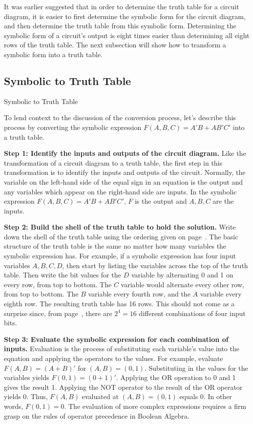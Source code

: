 It was earlier suggested that in order to determine the truth table for a
circuit diagram, it is easier to first determine the symbolic form for
the circuit diagram, and then determine the truth table from this symbolic 
form.  Determining the symbolic form of a circuit's output is eight times
easier than determining all eight rows of the truth table.
The next subsection will show how to transform a symbolic 
form into a truth table.

\subsection{Symbolic to Truth Table}

\begin{process}{Symbolic to Truth Table}
\label{process:representationSymToTT}

To lend context to the discussion of the conversion process, let's describe this
process by converting the symbolic expression
$F(A,B,C) = A'B + AB'C'$ into a truth table.


\textbf{Step 1:  Identify the inputs and outputs of the circuit diagram.}
Like the transformation of a circuit diagram to a truth table, the
first step in this transformation is to identify the inputs and outputs 
of the circuit.  Normally, the variable on the left-hand side
of the equal sign in an equation is the output and any variables 
which appear on the right-hand side are inputs.  In the symbolic expression
$F(A,B,C) = A'B + AB'C'$, $F$ is the output and $A,B,C$ are the inputs.

\textbf{Step 2:  Build the shell of the truth table to hold the solution.}
Write down the shell of the truth table using the
ordering given on page~\pageref{page:TTshell}.  The basic structure of the
truth table is the same no matter how many variables the symbolic 
expression has.  
For example, if a symbolic expression has four input variables $A,B,C,D$,
then start by listing the variables across the top of the truth table.  
Then write the bit values for the $D$ variable by alternating 0
and 1 on every row, from top to bottom. The $C$ variable would alternate 
every other row, from top to bottom.  The $B$ variable every
fourth row, and the $A$ variable every eighth row.  The resulting 
truth table has 16 rows.  This should not come as a surprise since,
from page~\pageref{page:two-to-N}, there are 
$2^4=16$ different combinations of four input bits.

\textbf{Step 3: Evaluate the symbolic expression for each combination of inputs.}
 Evaluation is the process
of substituting each variable's value into the equation and applying 
the operators to the values.  For example, evaluate $F(A,B) = (A+B)'$
for $(A,B) = (0,1)$.  Substituting in the values for the variables
yields $F(0,1) = (0+1)'$.  Applying the OR operation to 0 and 1 gives the 
result 1.  Applying the NOT operator to the result of the OR operator yields 0.
Thus, $F(A,B)$ evaluated at $(A,B)=(0,1)$ equals 0.  In other words,
$F(0,1)=0$.  The evaluation of more complex expressions requires 
a firm grasp on the rules of operator precedence in Boolean Algebra.
\end{process}

